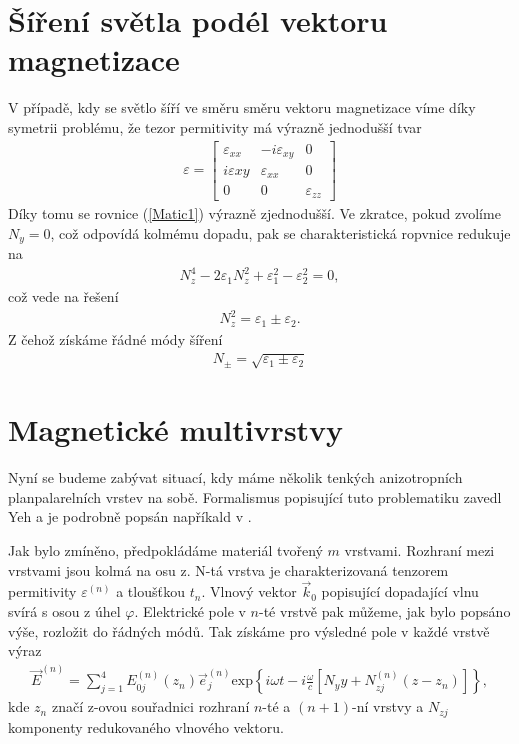 \section{Šíření světla podél vektoru magnetizace}
V případě, kdy se světlo šíří ve směru směru vektoru magnetizace víme díky symetrii problému, že tezor permitivity má výrazně jednodušší tvar
\begin{eqnarray}
\varepsilon=\begin{bmatrix}\varepsilon_{xx}&  -i\varepsilon_{xy}& 0 \\ i\varepsilon{xy}& \varepsilon_{xx}&  0 \\ 0&0& \varepsilon_{zz}\end{bmatrix}
\label{epsilon polar}
\end{eqnarray}
Díky tomu se rovnice (\ref{Matic1}) výrazně zjednodušší. Ve zkratce, pokud zvolíme $N_y=0$, což odpovídá kolmému dopadu, pak se charakteristická ropvnice redukuje na
\begin{eqnarray}
N_z^4-2\varepsilon_1N_z^2+\varepsilon_1^2-\varepsilon_2^2=0,
\end{eqnarray}
což vede na řešení
\begin{eqnarray}
N_z^2=\varepsilon_1 \pm \varepsilon_2.
\end{eqnarray}
Z čehož získáme řádné módy šíření
\begin{eqnarray}
N_\pm=\sqrt{\varepsilon_1\pm\varepsilon_2}
\end{eqnarray}


\section{Magnetické multivrstvy}
Nyní se budeme zabývat situací, kdy máme několik tenkých anizotropních planpalarelních vrstev na sobě. Formalismus popisující tuto problematiku zavedl Yeh a je podrobně popsán napříkald v \cite{Nyvlt}.

Jak bylo zmíněno, předpokládáme materiál tvořený $m$ vrstvami. Rozhraní mezi vrstvami jsou kolmá na osu z. N-tá vrstva je charakterizovaná tenzorem permitivity $\varepsilon^{(n)}$ a tloušťkou $t_n$. Vlnový vektor $\vec{k}_0$ popisující dopadající vlnu svírá s osou z úhel $\varphi$. Elektrické pole v $n$-té vrstvě pak můžeme, jak bylo popsáno výše, rozložit do řádných módů. Tak získáme pro výsledné pole v každé vrstvě výraz
\begin{eqnarray}
\vec{E}^{(n)}=\sum^4_{j=1}E_{0j}^{(n)}(z_n)\vec{e}_j^{(n)}\mbox{exp}\left\{i\omega t-i\frac{\omega}{c}[N_yy+N_{zj}^{(n)}(z-z_n)]\right\},
\end{eqnarray}
kde $z_n$ značí z-ovou souřadnici rozhraní $n$-té a $(n+1)$-ní vrstvy a $N_{zj}$ komponenty redukovaného vlnového vektoru.

